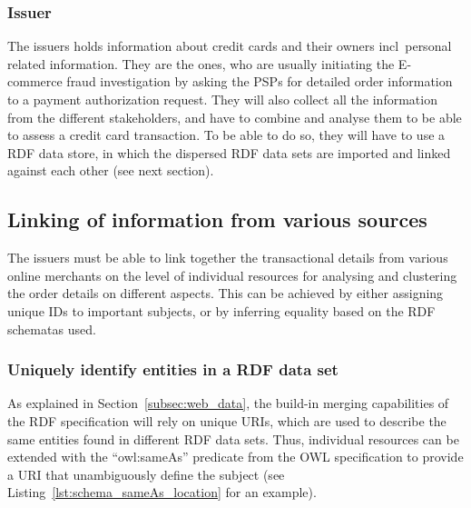 \subsubsection{Issuer}
\label{subsub:prep_info_issuer}

The issuers holds information about credit cards and their owners \gls{incl}\ personal related information. They are the ones, who are usually initiating the \gls{E-commerce} fraud investigation by asking the \gls{PSP}s for detailed order information to a payment authorization request. They will also collect all the information from the different stakeholders, and have to combine and analyse them to be able to assess a credit card transaction. To be able to do so, they will have to use a \gls{RDF} data store, in which the dispersed \gls{RDF} data sets are imported and linked against each other (see next section).

\subsection{Linking of information from various sources}
\label{subsec:information_mapping}

The issuers must be able to link together the transactional details from various online merchants on the level of individual resources for analysing and clustering the order details on different aspects. This can be achieved by either assigning unique IDs to important subjects, or by inferring equality based on the \gls{RDF} schematas used.

\subsubsection{Uniquely identify entities in a \gls{RDF} data set}
\label{subsub:info_unique_id}

As explained in Section~\ref{subsec:web_data}, the build-in merging capabilities of the \gls{RDF} specification will rely on unique \gls{URI}s, which are used to describe the same entities found in different \gls{RDF} data sets. Thus, individual resources can be extended with the ``owl:sameAs'' predicate from the \gls{OWL} specification to provide a \gls{URI} that unambiguously define the subject (see Listing~\ref{lst:schema_sameAs_location} for an example). \@


